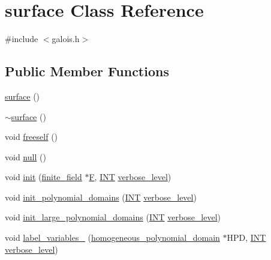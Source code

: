 \hypertarget{classsurface}{}\section{surface Class Reference}
\label{classsurface}


{\ttfamily \#include $<$galois.\+h$>$}

\subsection*{Public Member Functions}
\begin{DoxyCompactItemize}
\item 
\mbox{\hyperlink{classsurface_ab5fc521a35b0534321d79457e76e0f85}{surface}} ()
\item 
\mbox{\hyperlink{classsurface_a0d468eb3f6583074c61925c838ab7e42}{$\sim$surface}} ()
\item 
void \mbox{\hyperlink{classsurface_a454920a44ae0760e82aa7f8a40268df3}{freeself}} ()
\item 
void \mbox{\hyperlink{classsurface_a5511d97327063a0ef3cbc7c27f33eede}{null}} ()
\item 
void \mbox{\hyperlink{classsurface_a90570b0ca6ab02988159f2c40cb27308}{init}} (\mbox{\hyperlink{classfinite__field}{finite\+\_\+field}} $\ast$\mbox{\hyperlink{classsurface_a8ed6552162af114042077e109abf87f0}{F}}, \mbox{\hyperlink{galois_8h_a09fddde158a3a20bd2dcadb609de11dc}{I\+NT}} \mbox{\hyperlink{simeon_8_c_a818073fbcc2f439e7c56952f67386122}{verbose\+\_\+level}})
\item 
void \mbox{\hyperlink{classsurface_a1f13f4c6bdc98d14920a2644a52f8bb6}{init\+\_\+polynomial\+\_\+domains}} (\mbox{\hyperlink{galois_8h_a09fddde158a3a20bd2dcadb609de11dc}{I\+NT}} \mbox{\hyperlink{simeon_8_c_a818073fbcc2f439e7c56952f67386122}{verbose\+\_\+level}})
\item 
void \mbox{\hyperlink{classsurface_a4bed81f2918efe941518ab28d9a695d2}{init\+\_\+large\+\_\+polynomial\+\_\+domains}} (\mbox{\hyperlink{galois_8h_a09fddde158a3a20bd2dcadb609de11dc}{I\+NT}} \mbox{\hyperlink{simeon_8_c_a818073fbcc2f439e7c56952f67386122}{verbose\+\_\+level}})
\item 
void \mbox{\hyperlink{classsurface_adff9ddc650565dbcef50377e654e36e0}{label\+\_\+variables\+\_}} (\mbox{\hyperlink{classhomogeneous__polynomial__domain}{homogeneous\+\_\+polynomial\+\_\+domain}} $\ast$H\+PD, \mbox{\hyperlink{galois_8h_a09fddde158a3a20bd2dcadb609de11dc}{I\+NT}} \mbox{\hyperlink{simeon_8_c_a818073fbcc2f439e7c56952f67386122}{verbose\+\_\+level}})

\end{DoxyCompactItemize}
